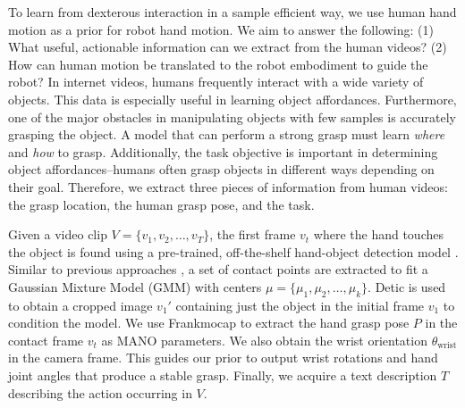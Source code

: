 



To learn from dexterous interaction in a sample efficient way, we use human hand motion as a prior for robot hand motion. We aim to answer the following: (1) What useful, actionable information can we extract from the human videos? (2) How can human motion be translated to the robot embodiment to guide the robot? In internet videos, humans frequently interact with a wide variety of objects. This data is especially useful in learning object affordances. Furthermore, one of the major obstacles in manipulating objects with few samples is accurately grasping the object. A model that can perform a strong grasp must learn \textit{where} and \textit{how} to grasp. Additionally, the task objective is important in determining object affordances--humans often grasp objects in different ways depending on their goal. Therefore, we extract three pieces of information from human videos: the grasp location, the human grasp pose, and the task.

Given a video clip $V = \{ v_1, v_2, \dots, v_T \} $, the first frame $v_t$ where the hand touches the object is found using a pre-trained, off-the-shelf hand-object detection model \cite{100doh}. Similar to previous approaches \cite{bahl2023affordances, hap, hoi, hotspots}, a set of contact points are extracted to fit a Gaussian Mixture Model (GMM) with centers $\mu = \{ \mu_1, \mu_2, \dots, \mu_k \}$.  Detic \cite{detic} is used to obtain a cropped image $v_1'$ containing just the object in the initial frame $v_1$ to condition the model. We use Frankmocap \cite{FrankMocap_2021_ICCV} to extract the hand grasp pose $P$ in the contact frame $v_t$ as MANO parameters. We also obtain the wrist orientation $\theta_\text{wrist}$ in the camera frame. This guides our prior to output wrist rotations and hand joint angles that produce a stable grasp. Finally, we acquire a text description $T$ describing the action occurring in $V$.

